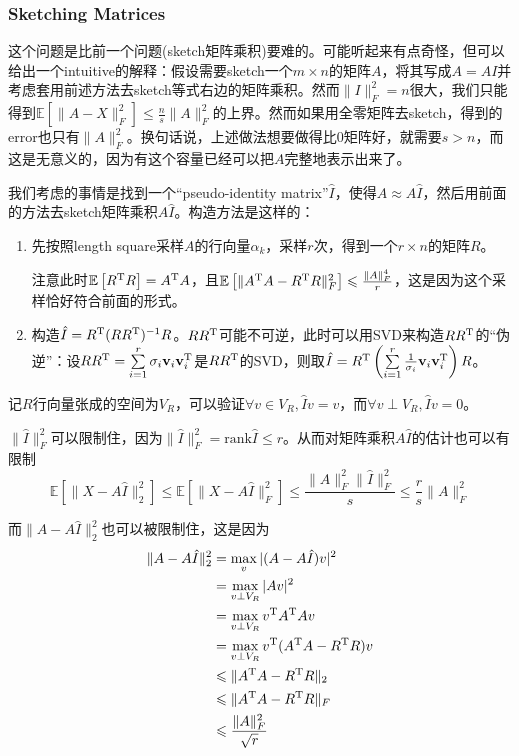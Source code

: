 \documentclass[8pt]{article}
\theoremstyle{compact}
\def\le{\leqslant}
\def\E#1{\mathbb{E}\left[{#1}\right]}
\begin{document}
\subsubsection{Sketching Matrices}
这个问题是比前一个问题(sketch矩阵乘积)要难的。可能听起来有点奇怪，但可以给出一个intuitive的解释：假设需要sketch一个$m \times n$的矩阵$A$，将其写成$A = AI$并考虑套用前述方法去sketch等式右边的矩阵乘积。然而$\|I\|_F^2 = n$很大，我们只能得到$\E{\|A - X\|_F^2} \le \frac{n}{s}\|A\|_F^2$的上界。然而如果用全零矩阵去sketch，得到的error也只有$\|A\|_F^2$。换句话说，上述做法想要做得比$0$矩阵好，就需要$s > n$，而这是无意义的，因为有这个容量已经可以把$A$完整地表示出来了。

我们考虑的事情是找到一个“pseudo-identity matrix”$\hat{I}$，使得$A \approx A\hat{I}$，然后用前面的方法去sketch矩阵乘积$A\hat{I}$。构造方法是这样的：
\begin{enumerate}
	\item 先按照length square采样$A$的行向量$\alpha_k$，采样$r$次，得到一个$r \times n$的矩阵$R$。
	
	注意此时$\E{R^{\text T}R} = A^{\text T}A$，且$\E{\|A^{\text T}A - R^\text{T}R\|_F^2} \le \frac{\|A\|_F^4}{r}$，这是因为这个采样恰好符合前面的形式。
	\item 构造$\hat{I} = R^{\text T}(RR^{\text T})^{-1}R$。$RR^{\text T}$可能不可逆，此时可以用SVD来构造$RR^{\text T}$的“伪逆”：设$RR^{\text T} = \sum\limits_{i=1}^{r}\sigma_i\mathbf v_i \mathbf v_i^{\text T}$是$RR^{\text T}$的SVD，则取$\hat{I} = R^{\text T}\left( \sum\limits_{i=1}^{r}\frac{1}{\sigma_i}\mathbf v_i \mathbf v_i^{\text T} \right)R$。
\end{enumerate}

记$R$行向量张成的空间为$V_R$，可以验证$\forall v \in V_R, \hat{I}v = v$，而$\forall v \perp V_R, \hat{I}v = 0$。

$\|\hat{I}\|_F^2$可以限制住，因为$\|\hat{I}\|_F^2 = \text{rank} \hat{I} \le r$。从而对矩阵乘积$A\hat{I}$的估计也可以有限制\begin{equation}
\E{\|X - A\hat{I}\|_2^2} \le \E{\|X - A\hat{I}\|_F^2} \le \frac{\|A\|_F^2 \|\hat{I}\|_F^2}{s} \le \frac{r}{s}\|A\|_F^2
\end{equation}

而$\|A - A\hat{I}\|_2^2$也可以被限制住，这是因为
\begin{equation}
\begin{split}
	\|A - A\hat{I}\|_2^2 &= \max_{v}|(A - A\hat{I})v|^2\\
	&= \max_{v \perp V_R} |Av|^2\\
	&= \max_{v \perp V_R} v^{\text T}A^{\text T}Av\\
	&= \max_{v \perp V_R} v^{\text T}(A^{\text T}A - R^{\text T}R)v\\
	&\le \|A^{\text T}A - R^{\text T}R\|_2\\
	&\le \|A^{\text T}A - R^{\text T}R\|_F\\
	&\le \frac{\|A\|_F^2}{\sqrt r}
\end{split}
\end{equation}
\end{document}
